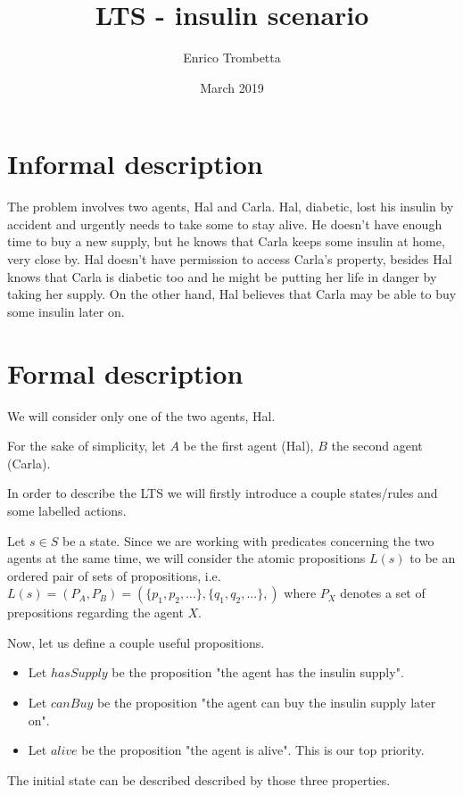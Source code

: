 \documentclass{article}
\title{LTS - insulin scenario}
\author{Enrico Trombetta }
\date{March 2019}
\begin{document}
\maketitle

\section{Informal description}
The problem involves two agents, Hal and Carla. Hal, diabetic, lost his insulin by accident and urgently needs to take some to stay alive. He doesn't have enough time to buy a new supply, but he knows that Carla keeps some insulin at home, very close by. Hal doesn't have permission to access Carla's property, besides Hal knows that Carla is diabetic too and he might be putting her life in danger by taking her supply. On the other hand, Hal believes that Carla may be able to buy some insulin later on.

\section{Formal description}
We will consider only one of the two agents, Hal.

For the sake of simplicity, let $A$ be the first agent (Hal), $B$ the second agent (Carla).

In order to describe the LTS we will firstly introduce a couple states/rules and some labelled actions.

Let $s \in S$ be a state. Since we are working with predicates concerning the two agents at the same time, we will consider the atomic propositions $L(s)$ to be an ordered pair of sets of propositions, i.e. $L(s) = (P_A, P_B) = (\{p_{1}, p_{2}, ...\}, \{q_{1}, q_{2},... \}, )$ where $P_X$ denotes a set of prepositions regarding the agent $X$.

Now, let us define a couple useful propositions.

\begin{itemize}
    \item Let $hasSupply$ be the proposition "the agent has the insulin supply".
    \item Let $canBuy$ be the proposition "the agent can buy the insulin supply later on".
    \item Let $alive$ be the proposition "the agent is alive". This is our top priority.
\end{itemize}

The initial state can be described described by those three properties.
\end{document}
